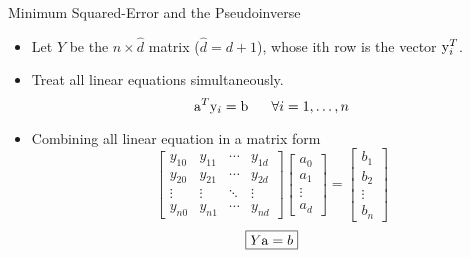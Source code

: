 \begin{frame}{Minimum Squared-Error and the Pseudoinverse}
\begin{itemize}
\item Let $Y$ be the $n\times \hat{d}$ matrix ($\hat{d}=d+1$), whose ith row is the vector ${\rm y}_i^T$.
\item Treat all linear equations simultaneously.
\[{\rm a}^T{\rm y}_i = {\rm b}~~~~~\forall i=1,\ldots,n\]
\item Combining all linear equation in a matrix form
\[\left[ {\begin{array}{*{20}{c}}
  {{y_{10}}}&{{y_{11}}}& \cdots &{{y_{1d}}} \\ 
  {{y_{20}}}&{{y_{21}}}& \cdots &{{y_{2d}}} \\ 
   \vdots & \vdots & \ddots & \vdots  \\ 
  {{y_{n0}}}&{{y_{n1}}}& \cdots &{{y_{nd}}} 
\end{array}} \right]\left[ {\begin{array}{*{20}{c}}
  {{a_0}} \\ 
  {{a_1}} \\ 
   \vdots  \\ 
  {{a_d}} 
\end{array}} \right] = \left[ {\begin{array}{*{20}{c}}
  {{b_1}} \\ 
  {{b_2}} \\ 
   \vdots  \\ 
  {{b_n}} 
\end{array}} \right]\]
\[\boxed{Y{\rm a}=b}\]
\end{itemize}
\end{frame}

